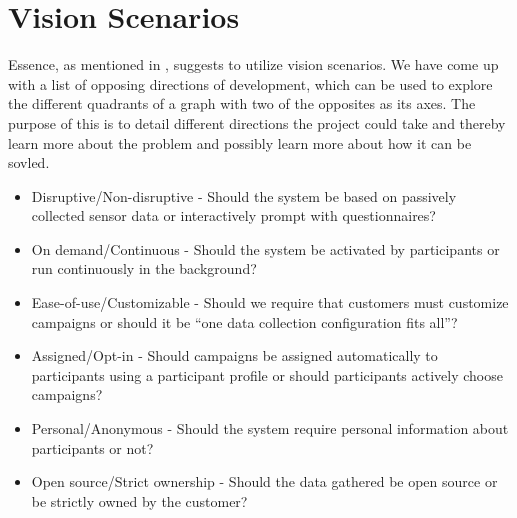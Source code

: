 \section{Vision Scenarios}
\label{sec:vision_scenarios}

Essence, as mentioned in , suggests to utilize vision scenarios. We have come up with a list of opposing directions of development, which can be used to explore the different quadrants of a graph with two of the opposites as its axes. The purpose of this is to detail different directions the project could take and thereby learn more about the problem and possibly learn more about how it can be sovled. 

\begin{itemize}
	\setlength\itemsep{-0.2em}
    \item Disruptive/Non-disruptive - Should the system be based on passively collected sensor data or interactively prompt with questionnaires? %
    \item On demand/Continuous - Should the system be activated by participants or run continuously in the background? %
    \item Ease-of-use/Customizable - Should we require that customers must customize campaigns or should it be ``one data collection configuration fits all''? %
    \item Assigned/Opt-in - Should campaigns be assigned automatically to participants using a participant profile or should participants actively choose campaigns? %
    \item Personal/Anonymous - Should the system require personal information about participants or not? %
    \item Open source/Strict ownership - Should the data gathered be open source or be strictly owned by the customer? %
\end{itemize}

